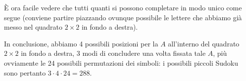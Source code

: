 {È ora facile vedere che tutti quanti si possono completare in modo unico come segue (conviene partire piazzando ovunque possibile le lettere che abbiamo già messo nel quadrato $2\times 2$ in fondo a destra).
\begin{center}
	\hfill
	\hfill
	\hfill
	\hfill\mbox{}
\end{center}

In conclusione, abbiamo 4 possibili posizioni per la $A$ all'interno del quadrato $2\times 2$ in fondo a destra, 3 modi di concludere una volta fissata tale $A$, più ovviamente le 24 possibili permutazioni dei simboli: i possibili piccoli Sudoku sono pertanto
$3\cdot 4\cdot 24=288$.}

